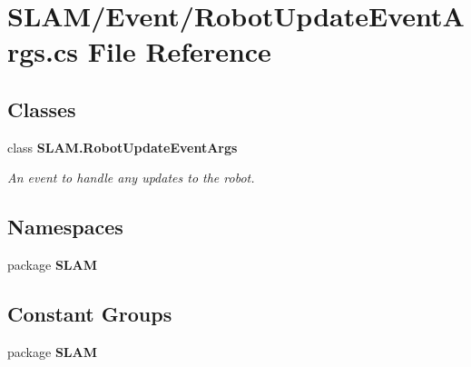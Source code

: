 \section{S\-L\-A\-M/\-Event/\-Robot\-Update\-Event\-Args.cs File Reference}
\label{_robot_update_event_args_8cs}
\subsection*{Classes}
\begin{DoxyCompactItemize}
\item 
class {\bf S\-L\-A\-M.\-Robot\-Update\-Event\-Args}
\begin{DoxyCompactList}\small\item\em An event to handle any updates to the robot. \end{DoxyCompactList}\end{DoxyCompactItemize}
\subsection*{Namespaces}
\begin{DoxyCompactItemize}
\item 
package {\bf S\-L\-A\-M}
\end{DoxyCompactItemize}
\subsection*{Constant Groups}
\begin{DoxyCompactItemize}
\item 
package {\bf S\-L\-A\-M}
\end{DoxyCompactItemize}

